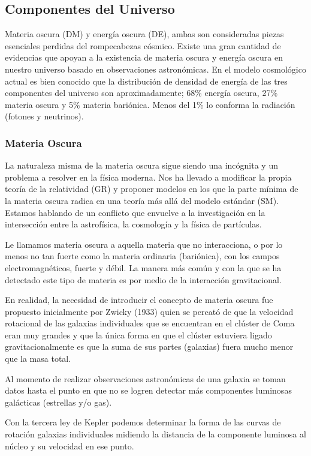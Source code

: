 \documentclass[12pt]{article}
\begin{document}
\subsection{Componentes del Universo}

Materia oscura (DM) y energía oscura (DE), ambas son consideradas piezas esenciales perdidas del rompecabezas cósmico. Existe una gran cantidad de evidencias que apoyan a la existencia de materia oscura y energía oscura en nuestro universo basado en observaciones astronómicas. En el modelo cosmológico actual es bien conocido que la distribución de densidad de energía de las tres componentes del universo son aproximadamente; 68\% energía oscura, 27\% materia oscura y 5\% materia bariónica. Menos del 1\% lo conforma la radiación (fotones y neutrinos).

\subsubsection{Materia Oscura}
\noindent La naturaleza misma de la materia oscura sigue siendo una incógnita y un problema a resolver en la física moderna. Nos ha llevado a modificar la propia teoría de la relatividad (GR) y proponer modelos en los que la parte mínima de la materia oscura radica en una teoría más allá del modelo estándar (SM). Estamos hablando de un conflicto que envuelve a la investigación en la intersección entre la astrofísica, la cosmología y la física de partículas.

Le llamamos materia oscura a aquella materia que no interacciona, o por lo menos no tan fuerte como la materia ordinaria (bariónica), con los campos electromagnéticos, fuerte y débil. La manera más común y con la que se ha detectado este tipo de materia es por medio de la interacción gravitacional. \cite{Faber_2006}

En realidad, la necesidad de introducir el concepto de materia oscura fue propuesto inicialmente por Zwicky (1933) quien se percató de que la velocidad rotacional de las galaxias individuales que se encuentran en el clúster de Coma eran muy grandes y que la única forma en que el clúster estuviera ligado gravitacionalmente es que la suma de sus partes (galaxias) fuera mucho menor que la masa total.

Al momento de realizar observaciones astronómicas de una galaxia se toman datos hasta el punto en que no se logren detectar más componentes luminosas galácticas (estrellas y/o gas). 

Con la tercera ley de Kepler podemos determinar la forma de las curvas de rotación galaxias individuales midiendo la distancia de la componente luminosa al núcleo y su velocidad en ese punto. \cite{Sahni_2004}
\end{document}

